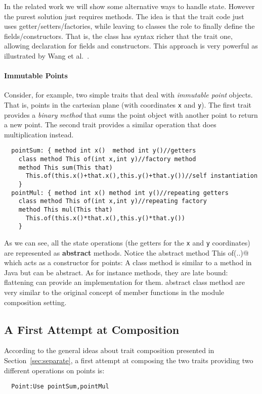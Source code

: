 In the related work we will show some alternative ways to handle
state.  However the purest solution just requires methods. The idea is
that the trait code just uses getter/setters/factories, while leaving
to classes the role to finally define the fields/constructors. That
is, the class has syntax richer that the trait one, allowing
declaration for fields and constructors.  This approach is very
powerful as illustrated by Wang et al.~\cite{wang2016classless}.

\paragraph{Immutable Points} Consider, for example, two simple 
traits that deal with \emph{immutable point} objects. That is, points
in the cartesian plane (with coordinates \lstinline{x} and
\lstinline{y}). The first trait provides a \emph{binary method} that 
sums the point object with another point to return a new point. 
The second trait provides a similar operation that does multiplication 
instead.
 
\begin{lstlisting}
  pointSum: { method int x()  method int y()//getters
    class method This of(int x,int y)//factory method
    method This sum(This that)
      This.of(this.x()+that.x(),this.y()+that.y())//self instantiation
    }
  pointMul: { method int x() method int y()//repeating getters
    class method This of(int x,int y)//repeating factory
    method This mul(This that)
      This.of(this.x()*that.x(),this.y()*that.y())
    }
\end{lstlisting}

\noindent As we can see, all the state operations (the getters for the 
\lstinline{x} and \lstinline{y} coordinates) are represented as {\bf abstract} methods.
Notice the abstract \Q@class method This of(..)@ which acts as a constructor
for points:
A class method is similar to a \Q@static@ method in Java but can be abstract. 
As for instance methods, they are late bound:  flattening can provide an implementation for them.
abstract class method are very similar to the original concept of member functions in the module composition setting.

\subsection{A First Attempt at Composition}
According to the general ideas about trait composition presented in
Section~\ref{sec:separate}, a first attempt at composing the two traits providing
two different operations on points is:
\begin{lstlisting}
  Point:Use pointSum,pointMul
\end{lstlisting}  

